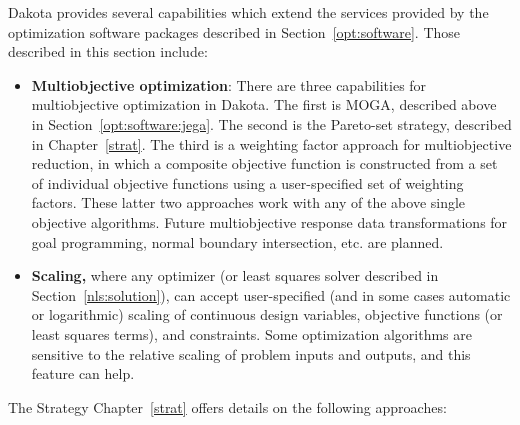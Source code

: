 Dakota provides several capabilities which extend the services
provided by the optimization software packages described in
Section~\ref{opt:software}. Those described in this section include:
\begin{itemize}
\item {\bf Multiobjective optimization}: There are three capabilities
  for multiobjective optimization in Dakota.  The first is MOGA,
  described above in Section~\ref{opt:software:jega}.  The second is
  the Pareto-set strategy, described in Chapter~\ref{strat}.  The
  third is a weighting factor approach for multiobjective reduction,
  in which a composite objective function is constructed from a set of
  individual objective functions using a user-specified set of
  weighting factors.  These latter two approaches work with any of the
  above single objective algorithms.  Future multiobjective response
  data transformations for goal programming, normal boundary
  intersection, etc. are planned.
\item {\bf Scaling,} where any optimizer (or least squares solver
  described in Section~\ref{nls:solution}), can accept user-specified
  (and in some cases automatic or logarithmic) scaling of continuous
  design variables, objective functions (or least squares terms), and
  constraints.  Some optimization algorithms are sensitive to the
  relative scaling of problem inputs and outputs, and this feature can
  help.
\end{itemize}
The Strategy Chapter~\ref{strat} offers details on the following
approaches:
